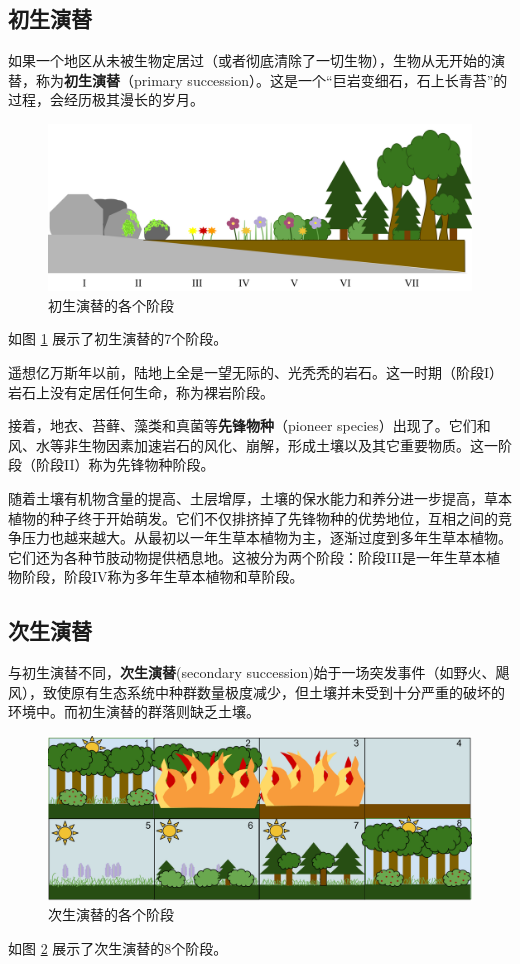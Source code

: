 \subsection{初生演替}
如果一个地区从未被生物定居过（或者彻底清除了一切生物），生物从无开始的演替，称为\textbf{初生演替}（primary succession）。这是一个“巨岩变细石，石上长青苔”的过程，会经历极其漫长的岁月。

\begin{figure}[htbp]
    \centering
    \includegraphics[width=400pt]{images/primary-succession.png}
    \caption{初生演替的各个阶段}
    \label{fig:primary-succession}
\end{figure}

如图 \ref{fig:primary-succession} 展示了初生演替的7个阶段。

遥想亿万斯年以前，陆地上全是一望无际的、光秃秃的岩石。这一时期（阶段I）岩石上没有定居任何生命，称为裸岩阶段。

接着，地衣、苔藓、藻类和真菌等\textbf{先锋物种}（pioneer species）出现了。它们和风、水等非生物因素加速岩石的风化、崩解，形成土壤以及其它重要物质。这一阶段（阶段II）称为先锋物种阶段。

随着土壤有机物含量的提高、土层增厚，土壤的保水能力和养分进一步提高，草本植物的种子终于开始萌发。它们不仅排挤掉了先锋物种的优势地位，互相之间的竞争压力也越来越大。从最初以一年生草本植物为主，逐渐过度到多年生草本植物。它们还为各种节肢动物提供栖息地。这被分为两个阶段：阶段III是一年生草本植物阶段，阶段IV称为多年生草本植物和草阶段。

\subsection{次生演替}
与初生演替不同，\textbf{次生演替}(secondary succession)始于一场突发事件（如野火、飓风），致使原有生态系统中种群数量极度减少，但土壤并未受到十分严重的破坏的环境中。而初生演替的群落则缺乏土壤。

\begin{figure}[htbp]
    \centering
    \includegraphics[width=400pt]{images/secondary-succession.png}
    \caption{次生演替的各个阶段}
    \label{fig:secondary-succession}
\end{figure}

如图 \ref{fig:secondary-succession} 展示了次生演替的8个阶段。
